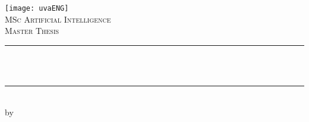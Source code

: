 \documentclass{article}
\newcommand{\red}[1]{{\color{red}{#1}}}
\begin{document}
\begin{titlepage}



\newcommand{\HRule}{\rule{\linewidth}{0.5mm}} %

\center %

 






\texttt{[image: uvaENG]}\\[2.5cm]

\textsc{\Large MSc Artificial Intelligence}\\[0.2cm]

\textsc{\Large Master Thesis}\\[0.5cm] 








\HRule \\[0.4cm]

{ \huge \bfseries \red{Your Title that will take\\ Two Lines}}\\[0.4cm] %

\HRule \\[0.5cm]

 






by\\[0.2cm]

\textsc{\Large \red{Your Name}}\\[0.2cm] %


\end{titlepage}
\end{document}

